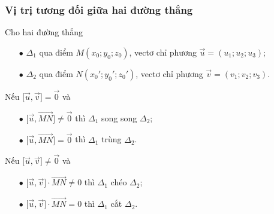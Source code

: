 \subsubsection{Vị trị tương đối giữa hai đường thẳng}
Cho hai đường thẳng 
\begin{itemize}
	\item [$\bullet$] $\Delta_1$ qua điểm $M(x_0;y_0;z_0)$, vectơ chỉ phương $\vec{u}=(u_1;u_2;u_3)$;
	\item [$\bullet$] $\Delta_2$ qua điểm $N(x_0';y_0';z_0')$, vectơ chỉ phương $\vec{v}=(v_1;v_2;v_3)$.
\end{itemize}
	\begin{listEX}[1]
		\item []  Nếu $\bigg[\vec{u},\vec{v}\bigg] = \vec{0}$ và 
		\begin{itemize}
			\item [$\bullet$] $\bigg[\vec{u},\vec{MN}\bigg]\ne \vec{0}$  thì $\Delta_1$ song song $\Delta_2$; 
			\item [$\bullet$] $\bigg[\vec{u},\vec{MN}\bigg]  =\vec{0}$  thì $\Delta_1$ trùng $\Delta_2$.
		\end{itemize}
		\item []  Nếu $\bigg[\vec{u},\vec{v}\bigg] \ne \vec{0}$ và 
		\begin{itemize}
			\item [$\bullet$] $\bigg[\vec{u},\vec{v}\bigg] \cdot \vec{MN} \ne 0$  thì $\Delta_1$ chéo $\Delta_2$; 
			\item [$\bullet$] $\bigg[\vec{u},\vec{v}\bigg] \cdot \vec{MN} =0$  thì $\Delta_1$ cắt $\Delta_2$.
		\end{itemize}
	\end{listEX}
